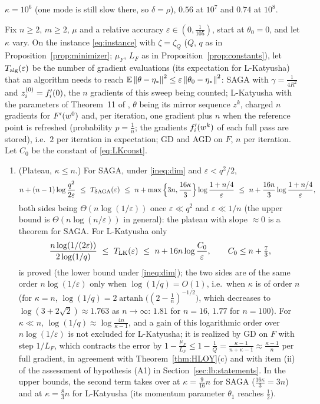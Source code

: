 \begin{remark}
$\kappa=10^6$ (one mode is still slow there, so $\delta=\rho$), $0.56$ at $10^7$ and $0.74$ at $10^8$.
\end{remark}

\begin{proposition}
\label{prop:A4}
Fix $n\ge2$, $m\ge2$, $\mu$ and a relative accuracy $\varepsilon\in(0,\frac1{105})$, start at $\theta_0=0$, and let $\kappa$ vary. On the instance \eqref{eq:instance} with $\zeta=\zeta_Q$ ($Q$, $q$ as in Proposition~\ref{prop:minimizer}; $\mu_F$, $L_F$ as in Proposition~\ref{prop:constants}), let $T_{\rm alg}(\varepsilon)$ be the number of gradient evaluations (its expectation for L-Katyusha) that an algorithm needs to reach $\mathbb{E}\left\|\theta-\eta_\ast\right\|^2\le\varepsilon\left\|\theta_0-\eta_\ast\right\|^2$: SAGA with $\gamma=\frac1{4R^2}$ and $z_i^{(0)}=f'_i(0)$, the $n$ gradients of this sweep being counted; L-Katyusha with the parameters of Theorem~11 of \cite{kovalev2020dont}, $\theta$ being its mirror sequence $z^k$, charged $n$ gradients for $F'(w^0)$ and, per iteration, one gradient plus $n$ when the reference point is refreshed (probability $p=\frac1n$; the gradients $f'_i(w^k)$ of each full pass are stored), i.e.\ $2$ per iteration in expectation; GD and AGD on $F$, $n$ per iteration. Let $C_0$ be the constant of \eqref{eq:LKconst}.
\begin{enumerate}[nosep,label=(\roman*)]
\item (Plateau, $\kappa\le n$.) For SAGA, under \eqref{ineq:dim} and $\varepsilon<q^2/2$,
\[
n+(n-1)\log\frac{q^2}{2\varepsilon}\ \le\ T_{\rm SAGA}(\varepsilon)\ \le\ n+\max\Big\{3n,\frac{16\kappa}3\Big\}\log\frac{1+n/4}\varepsilon\ \le\ n+\frac{16n}3\log\frac{1+n/4}\varepsilon ,
\]
both sides being $\Theta(n\log(1/\varepsilon))$ once $\varepsilon\ll q^2$ and $\varepsilon\ll1/n$ (the upper bound is $\Theta(n\log(n/\varepsilon))$ in general): the plateau with slope $\approx0$ is a theorem for SAGA. For L-Katyusha only
\[
\frac{n\log(1/(2\varepsilon))}{2\log(1/q)}\ \le\ T_{\rm LK}(\varepsilon)\ \le\ n+16n\log\frac{C_0}\varepsilon,\qquad C_0\le n+\tfrac73,
\]
is proved (the lower bound under \eqref{ineq:dim}); the two sides are of the same order $n\log(1/\varepsilon)$ only when $\log(1/q)=O(1)$, i.e.\ when $\kappa$ is of order $n$ (for $\kappa=n$, $\log(1/q)=2\operatorname{artanh}\big((2-\frac1n)^{-1/2}\big)$, which decreases to $\log(3+2\sqrt2)\approx1.763$ as $n\to\infty$: $1.81$ for $n=16$, $1.77$ for $n=100$). For $\kappa\ll n$, $\log(1/q)\approx\log\frac{4n}{\kappa-1}$, and a gain of this logarithmic order over $n\log(1/\varepsilon)$ is not excluded for L-Katyusha; it is realized by GD on $F$ with step $1/L_F$, which contracts the error by $1-\frac{\mu_F}{L_F}\le1-\frac1Q=\frac{\kappa-1}{n+\kappa-1}\approx\frac{\kappa-1}n$ per full gradient, in agreement with Theorem~\ref{thm:HLOY}(c) and with item (ii) of the assessment of hypothesis (A1) in Section~\ref{sec:lb:statements}. In the upper bounds, the second term takes over at $\kappa=\frac9{16}n$ for SAGA ($\frac{16\kappa}3=3n$) and at $\kappa=\frac83n$ for L-Katyusha (its momentum parameter $\theta_1$ reaches $\frac12$).

\end{enumerate}
\end{proposition}

